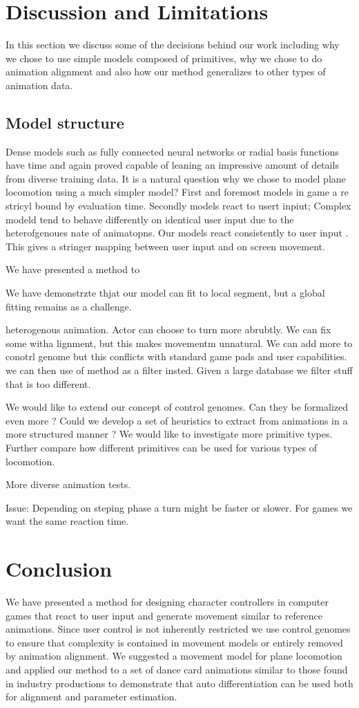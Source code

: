 \section{Discussion and Limitations}
In this section we discuss some of the decisions behind our work including why we chose to use simple models composed of primitives, why we chose to do animation alignment and also how our method generalizes to other types of animation data. 

\subsection{Model structure}
Dense models such as fully connected neural networks or radial basis functions have time and again proved capable of leaning an impressive amount of details from diverse training data. It is a natural question why we chose to model plane locomotion using a much simpler model? First and foremost models in game a re stricyl bound by evaluation time. Secondly models react to usert inpiut; Complex modeld tend to behave differently on identical user input due to the heterofgenoues nate of animatopns. Our models react consistently to user input . This gives a stringer mapping between user input and on screen movement.


We have presented a method to 

We have demonstrzte thjat our model can fit to local segment, but a global fitting remains as a challenge.

heterogenous animation. Actor can choose to turn more abrubtly. We can fix some witha lignment, but this makes movementm unnatural. We can add more to conotrl genome but this conflicts with standard game pads and user capabilities. we can then use of method as a filter insted. Given a large database we filter stuff that is too different.


We would like to extend our concept of control genomes. Can they be formalized even more ? Could we develop a set of heuristics to extract from animations in a more structured manner ? 
We would like to investigate more primitive types. Further compare how different primitives can be used for various types of locomotion.

More diverse animation tests.


Issue: Depending on steping phase a turn might be faster or slower. For games we want the same reaction time.

\section{Conclusion}
We have presented a method for designing character controllers in computer games that react to user input and generate movement similar to reference animations. Since user control is not inherently restricted we use control genomes to ensure that complexity is contained in movement models or entirely removed by animation alignment. We suggested a movement model for plane locomotion and applied our method to a set of dance card animations similar to those found in industry productions to demonstrate that auto differentiation can be used both for alignment and parameter estimation.  



